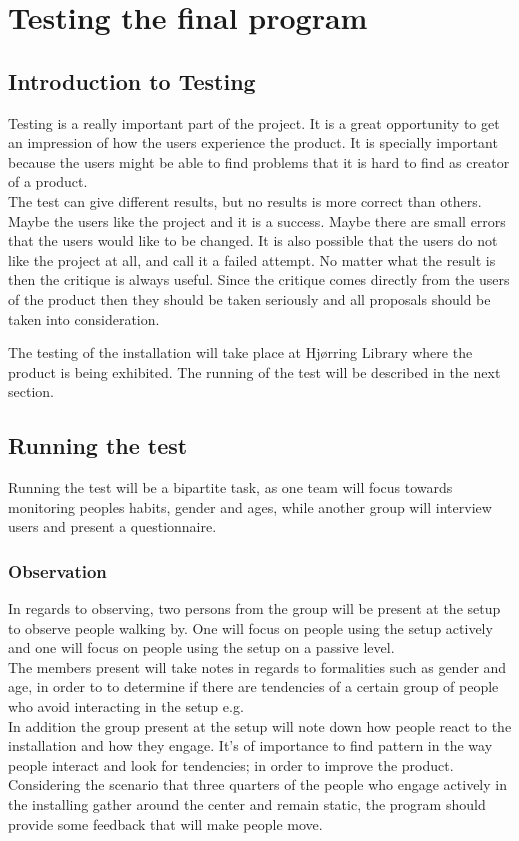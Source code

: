 \chapter{Testing the final program}
\section{Introduction to Testing}
Testing is a really important part of the project. It is a great opportunity to get an impression of how the users experience the product. It is specially important because the users might be able to find problems that it is hard to find as creator of a product. \\
The test can give different results, but no results is more correct than others. Maybe the users like the project and it is a success. Maybe there are small errors that the users would like to be changed. It is also possible that the users do not like the project at all, and call it a failed attempt. No matter what the result is then the critique is always useful. Since the critique comes directly from the users of the product then they should be taken seriously and all proposals should be taken into consideration. 

The testing of the installation will take place at Hj{\o}rring Library where the product is being exhibited. The running of the test will be described in the next section.




\section{Running the test}
Running the test will be a bipartite task, as one team will focus towards monitoring peoples habits, gender and ages, while another group will interview users and present a questionnaire.
\subsection{Observation}
In regards to observing, two persons from the group will be present at the setup to observe people walking by. One will focus on people using the setup actively and one will focus on people using the setup on a passive level.\\
The members present will take notes in regards to formalities such as gender and age, in order to to determine if there are tendencies of a certain group of people who avoid interacting in the setup e.g.\\
In addition the group present at the setup will note down how people react to the installation and how they engage. It's of importance to find pattern in the way people interact and look for tendencies; in order to improve the product. Considering the scenario that three quarters of the people who engage actively in the installing gather around the center and remain static, the program should provide some feedback that will make people move.

